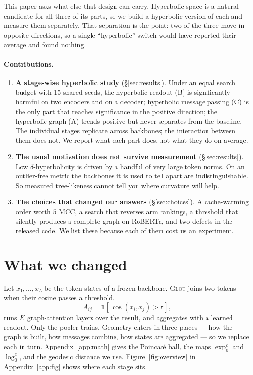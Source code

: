 \documentclass{article}
\begin{document}
This paper asks what else that design can carry. Hyperbolic space is a natural
candidate for all three of its parts, so we build a hyperbolic version of each
and measure them separately. That separation is the point: two of the three
move in opposite directions, so a single ``hyperbolic'' switch would have
reported their average and found nothing.

\paragraph{Contributions.}
\begin{enumerate}
\itemsep1pt
\item \textbf{A stage-wise hyperbolic study} (\S\ref{sec:results}). Under an
      equal search budget with 15 shared seeds, the hyperbolic readout (B) is
      significantly harmful on two encoders and on a decoder; hyperbolic message
      passing (C) is the only part that reaches significance in the positive
      direction; the hyperbolic graph (A) trends positive but never separates
      from the baseline. The individual stages replicate across backbones; the
      interaction between them does not. We report what each part does, not
      what they do on average.
\item \textbf{The usual motivation does not survive measurement}
      (\S\ref{sec:results}). Low $\delta$-hyperbolicity is driven by a handful
      of very large token norms. On an outlier-free metric the backbones it is
      used to tell apart are indistinguishable. So measured tree-likeness
      cannot tell you where curvature will help.
\item \textbf{The choices that changed our answers} (\S\ref{sec:choices}). A
      cache-warming order worth $5$ MCC, a search that reverses arm rankings, a
      threshold that silently produces a complete graph on RoBERTa, and two
      defects in the released code. We list these because each of them cost us
      an experiment.
\end{enumerate}

\section{What we changed}
\label{sec:method}

Let $x_1,\dots,x_L$ be the token states of a frozen backbone. \textsc{Glot}
joins two tokens when their cosine passes a threshold,
\begin{equation}
A_{ij} = \mathbf{1}\!\left[\, \cos(x_i, x_j) > \tau \,\right],
\label{eq:adj}
\end{equation}
runs $K$ graph-attention layers over the result, and aggregates with a learned
readout. Only the pooler trains. Geometry enters in three places --- how the
graph is built, how messages combine, how states are aggregated --- so we
replace each in turn. Appendix~\ref{app:math} gives the Poincar\'e ball, the
maps $\exp^c_0$ and $\log^c_0$, and the geodesic distance we use.
Figure~\ref{fig:overview} in Appendix~\ref{app:fig} shows where each stage sits.
\end{document}
